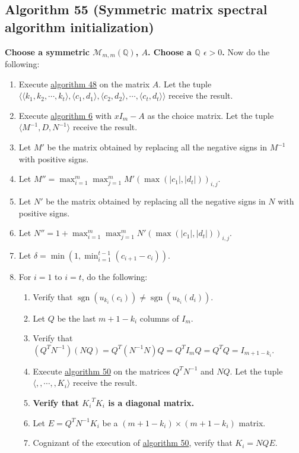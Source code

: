 \documentclass[twocolumn]{article}
\DeclareMathOperator{\sgn}{sgn}
\begin{document}
		\subsection{Algorithm 55 (Symmetric matrix spectral algorithm initialization)}\label{sec:algorithm 55}
			\textbf{Choose a symmetric $\mathcal{M}_{m,m}(\mathbb{Q})$, $A$. Choose a $\mathbb{Q}$ $\epsilon>0$.} Now do the following:
			\begin{enumerate}
				\item Execute \hyperref[sec:algorithm 48]{algorithm 48} on the matrix $A$. Let the tuple $\langle\langle k_1,k_2,\cdots,k_t\rangle,\langle c_1,d_1\rangle,\langle c_2,d_2\rangle,\cdots,\langle c_t,d_t\rangle\rangle$ receive the result.
				\item Execute \hyperref[sec:algorithm 6]{algorithm 6} with $xI_m-A$ as the choice matrix. Let the tuple $\langle M^{-1},D,N^{-1}\rangle$ receive the result.
				\item Let $M'$ be the matrix obtained by replacing all the negative signs in $M^{-1}$ with positive signs.
				\item Let $M''=\max_{i=1}^m\max_{j=1}^mM'(\max(\lvert c_1\rvert,\lvert d_t\rvert))_{i,j}$.
				\item Let $N'$ be the matrix obtained by replacing all the negative signs in $N$ with positive signs.
				\item Let $N''=1+\max_{i=1}^m\max_{j=1}^mN'(\max(\lvert c_1\rvert,\lvert d_t\rvert))_{i,j}$.
				\item Let $\delta=\min(1,\min_{i=1}^{t-1}(c_{i+1}-c_i))$.
				\item For $i=1$ to $i=t$, do the following:
				\begin{enumerate}
					\item Verify that $\sgn(u_{k_i}(c_i))\ne\sgn(u_{k_i}(d_i))$.
					\item Let $Q$ be the last $m+1-k_i$ columns of $I_m$.
					\item Verify that $(Q^TN^{-1})(NQ)=Q^T(N^{-1}N)Q=Q^TI_mQ=Q^TQ=I_{m+1-k_i}$.
					\item Execute \hyperref[sec:algorithm 50]{algorithm 50} on the matrices $Q^TN^{-1}$ and $NQ$. Let the tuple $\langle ,,\cdots,,K_i\rangle$ receive the result.
					\item \textbf{Verify that ${K_i}^T{K_i}$ is a diagonal matrix.}
					\item Let $E=Q^TN^{-1}K_i$ be a $(m+1-k_i)\times(m+1-k_i)$ matrix.
					\item Cognizant of the execution of \hyperref[sec:algorithm 50]{algorithm 50}, verify that $K_i=NQE$.

\end{enumerate}
\end{enumerate}
\end{document}
